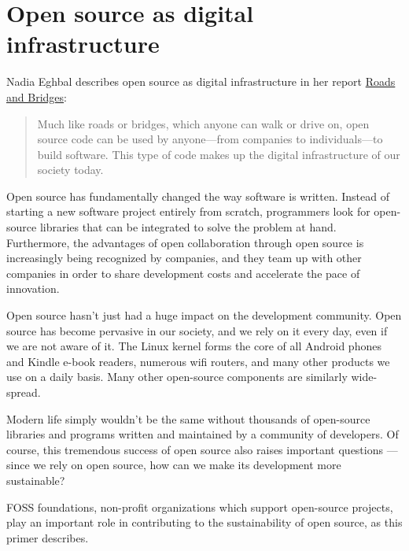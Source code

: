 


\chapter{Open source as digital infrastructure}

Nadia Eghbal describes open source as digital infrastructure in her report \href{https://www.fordfoundation.org/work/learning/research-reports/roads-and-bridges-the-unseen-labor-behind-our-digital-infrastructure/}{Roads and Bridges}:

\begin{quote}

Much like roads or bridges, which anyone can walk or drive on, open source code can be used by anyone—from companies to individuals—to build software. This type of code makes up the digital infrastructure of our society today.

\end{quote}

Open source has fundamentally changed the way software is written.  Instead of starting a new software project entirely from scratch, programmers look for open-source libraries that can be integrated to solve the problem at hand.  Furthermore, the advantages of open collaboration through open source is increasingly being recognized by companies, and they team up with other companies in order to share development costs and accelerate the pace of innovation.

Open source hasn't just had a huge impact on the development community.  Open source has become pervasive in our society, and we rely on it every day, even if we are not aware of it.  The Linux kernel forms the core of all Android phones and Kindle e-book readers, numerous wifi routers, and many other products we use on a daily basis.  Many other open-source components are similarly wide-spread.

Modern life simply wouldn't be the same without thousands of open-source libraries and programs written and maintained by a community of developers.  Of course, this tremendous success of open source also raises important questions --- since we rely on open source, how can we make its development more sustainable?

FOSS foundations, non-profit organizations which support open-source projects, play an important role in contributing to the sustainability of open source, as this primer describes.

